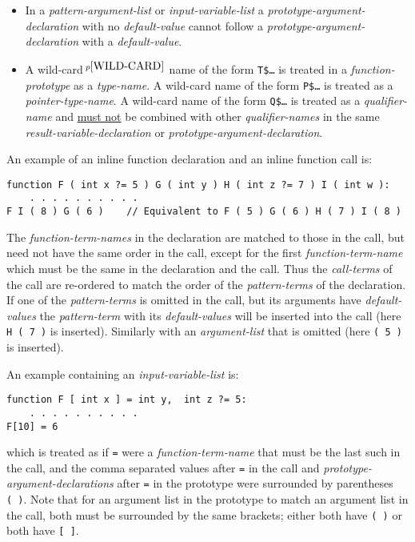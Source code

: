 \documentclass[12pt]{article}
\newcommand{\pagnote}[1]{$\,^{p\pageref{#1}}$}
\newenvironment{indpar}[1][0.3in]%
	{\begin{list}{}%
		     {\setlength{\itemsep}{0in}%
		      \setlength{\topsep}{0in}%
		      \setlength{\parsep}{1ex}%
		      \setlength{\labelwidth}{#1}%
		      \setlength{\leftmargin}{#1}%
		      \addtolength{\leftmargin}{\labelsep}}%
	 \item}%
	{\end{list}}
\begin{document}
\begin{indpar}[0.1in]
\begin{itemize}
\item
In a {\em pattern-argument-list} or {\em input-variable-list}
a {\em prototype-argument-declaration} with no {\em de\-fault-value} cannot
follow a {\em prototype-argument-declaration} with a {\em default-value}.
\item
A wild-card\pagnote{WILD-CARD} name of the form {\tt T\$\ldots}
is treated in a {\em function-prototype} as a {\em type-name}.
A wild-card name of the form {\tt P\$\ldots} is treated as a
{\em pointer-type-name}.
A wild-card name of the form {\tt Q\$\ldots} is treated as a
{\em qualifier-name} and \underline{must not} be combined with
other {\em qualifier-names} in the same {\em result-variable-declaration}
or {\em prototype-argument-declaration}.

\end{itemize}
\end{indpar}

An example of an inline function declaration and an inline function call is:
\begin{indpar}\begin{verbatim}
function F ( int x ?= 5 ) G ( int y ) H ( int z ?= 7 ) I ( int w ):
    . . . . . . . . . .
F I ( 8 ) G ( 6 )    // Equivalent to F ( 5 ) G ( 6 ) H ( 7 ) I ( 8 )
\end{verbatim}\end{indpar}

The {\em function-term-names} in the declaration are matched to those
in the call, but need not have the same order in the call, except for
the first {\em function-term-name} which must be the same in the
declaration and the call.  Thus the {\em call-terms} of the call
are re-ordered to match the order of the {\em pattern-terms} of the
declaration.  If one of the {\em pattern-terms} is omitted in the
call, but its arguments have {\em default-values}
the {\em pattern-term} with its
{\em default-values} will be inserted into the call
(here {\tt H ( 7 )} is inserted).
Similarly with an {\em argument-list} that is omitted
(here {\tt ( 5 )} is inserted).

An example containing an {\em input-variable-list} is:
\begin{indpar}\begin{verbatim}
function F [ int x ] = int y,  int z ?= 5:
    . . . . . . . . . .
F[10] = 6
\end{verbatim}\end{indpar}
which is treated as if {\tt =} were a {\em function-term-name}
that must be the last such in the call, and the comma separated
values after {\tt =}
in the call and {\em prototype-argument-declarations} after {\tt =}
in the prototype
were surrounded by parentheses {\tt (~)}.  Note that for an argument
list in the prototype to match an argument list in the call, both
must be surrounded by the same brackets; either both have {\tt (~)}
or both have {\tt [~]}.
\end{document}
